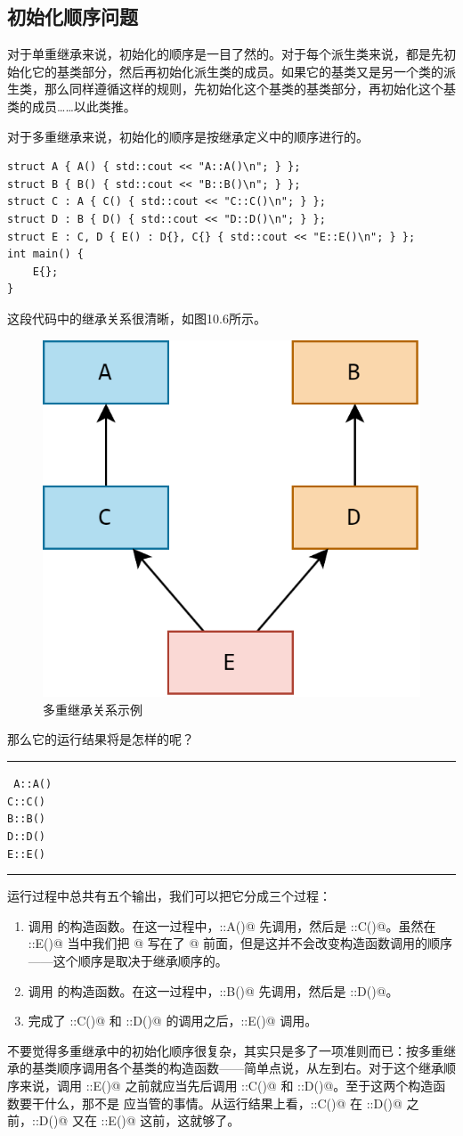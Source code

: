 \subsection*{初始化顺序问题}
对于单重继承来说，初始化的顺序是一目了然的。对于每个派生类来说，都是先初始化它的基类部分，然后再初始化派生类的成员。如果它的基类又是另一个类的派生类，那么同样遵循这样的规则，先初始化这个基类的基类部分，再初始化这个基类的成员……以此类推。\par
对于多重继承来说，初始化的顺序是按继承定义中的顺序进行的。
\begin{lstlisting}
struct A { A() { std::cout << "A::A()\n"; } };
struct B { B() { std::cout << "B::B()\n"; } };
struct C : A { C() { std::cout << "C::C()\n"; } };
struct D : B { D() { std::cout << "D::D()\n"; } };
struct E : C, D { E() : D{}, C{} { std::cout << "E::E()\n"; } };
int main() {
    E{};
}
\end{lstlisting}
这段代码中的继承关系很清晰，如图10.6所示。
\begin{figure}[htbp]
    \centering
    \includegraphics[width=.36\textwidth]{../images/generalized_parts/10_multiple_inheritance_example.png}
    \caption{多重继承关系示例}
\end{figure}
那么它的运行结果将是怎样的呢？\\\noindent\rule{\linewidth}{.2pt}\texttt{
A::A()\\
C::C()\\
B::B()\\
D::D()\\
E::E()
}\\\noindent\rule{\linewidth}{.2pt}
运行过程中总共有五个输出，我们可以把它分成三个过程：
\begin{enumerate}
    \item 调用 \lstinline@C@ 的构造函数。在这一过程中，\lstinline@A::A()@ 先调用，然后是 \lstinline@C::C()@。虽然在 \lstinline@E::E()@ 当中我们把 \lstinline@D{}@ 写在了 \lstinline@C{}@ 前面，但是这并不会改变构造函数调用的顺序——这个顺序是取决于继承顺序的。
    \item 调用 \lstinline@D@ 的构造函数。在这一过程中，\lstinline@B::B()@ 先调用，然后是 \lstinline@D::D()@。
    \item 完成了 \lstinline@C::C()@ 和 \lstinline@D::D()@ 的调用之后，\lstinline@E::E()@ 调用。
\end{enumerate}
不要觉得多重继承中的初始化顺序很复杂，其实只是多了一项准则而已：按多重继承的基类顺序调用各个基类的构造函数——简单点说，从左到右。对于这个继承顺序来说，调用 \lstinline@E::E()@ 之前就应当先后调用 \lstinline@C::C()@ 和 \lstinline@D::D()@。至于这两个构造函数要干什么，那不是 \lstinline@E@ 应当管的事情。从运行结果上看，\lstinline@C::C()@ 在 \lstinline@D::D()@ 之前，\lstinline@D::D()@ 又在 \lstinline@E::E()@ 这前，这就够了。\par
